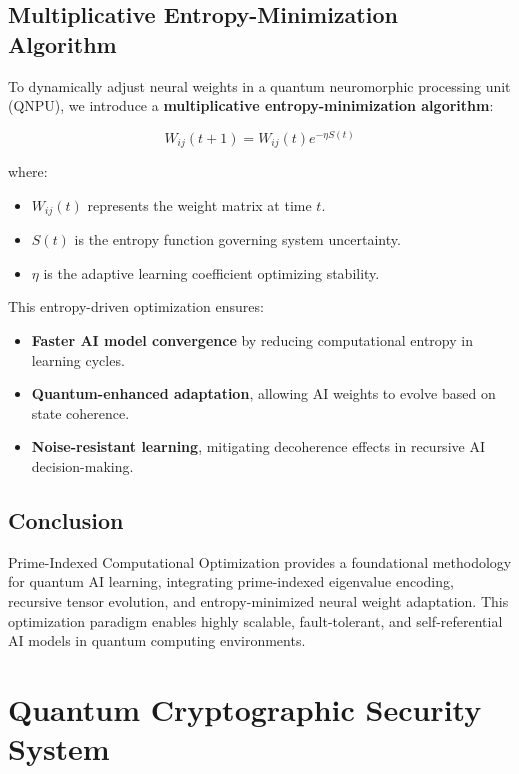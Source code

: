 \documentclass{article}
\theoremstyle{plain}
\begin{document}
\subsection{Multiplicative Entropy-Minimization Algorithm}

To dynamically adjust neural weights in a quantum neuromorphic processing unit (QNPU), we introduce a \textbf{multiplicative entropy-minimization algorithm}:

\begin{equation}
    W_{ij}(t+1) = W_{ij}(t) e^{-\eta S(t)}
\end{equation}

where:
\begin{itemize}
    \item \( W_{ij}(t) \) represents the weight matrix at time \( t \).
    \item \( S(t) \) is the entropy function governing system uncertainty.
    \item \( \eta \) is the adaptive learning coefficient optimizing stability.
\end{itemize}

This entropy-driven optimization ensures:
\begin{itemize}
    \item \textbf{Faster AI model convergence} by reducing computational entropy in learning cycles.
    \item \textbf{Quantum-enhanced adaptation}, allowing AI weights to evolve based on state coherence.
    \item \textbf{Noise-resistant learning}, mitigating decoherence effects in recursive AI decision-making.
\end{itemize}

\subsection{Conclusion}

Prime-Indexed Computational Optimization provides a foundational methodology for quantum AI learning, integrating prime-indexed eigenvalue encoding, recursive tensor evolution, and entropy-minimized neural weight adaptation. This optimization paradigm enables highly scalable, fault-tolerant, and self-referential AI models in quantum computing environments.

\section{Quantum Cryptographic Security System}
\end{document}
